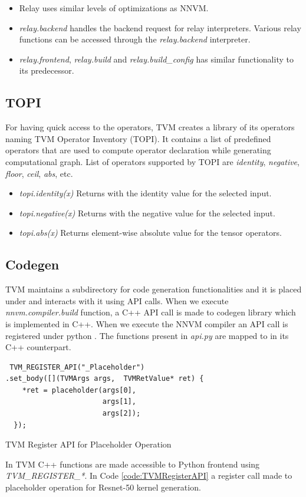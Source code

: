 \begin{itemize}
    \item Relay uses similar levels of optimizations as NNVM.
    \item \textit{relay.backend}  handles the backend request for relay interpreters. Various relay functions can be accessed through the \textit{relay.backend} interpreter.
    \item \textit{relay.frontend},  \textit{relay.build}  and \textit{relay.build\_config}  has similar functionality to its predecessor.
\end{itemize}

 \subsection{TOPI}
 For having quick access to the operators, TVM creates a library of its operators naming TVM Operator Inventory (TOPI). It contains a list of predefined operators that are used to compute operator declaration while generating computational graph. List of operators supported by TOPI are \textit{identity}, \textit{negative}, \textit{floor}, \textit{ceil}, \textit{abs}, etc.
 \begin{itemize}
\item \textit{topi.identity(x)} Returns with the identity value for the selected input.
\item \textit{topi.negative(x)} Returns with the negative value for the selected input.
\item \textit{topi.abs(x)}  Returns element-wise absolute value for the tensor operators.
 \end{itemize}
 
 \subsection{Codegen}
TVM maintains a subdirectory for code generation functionalities and it is placed under  and interacts with it using API calls. When we execute \textit{nnvm.compiler.build} function, a C++ API call is made to codegen library which is implemented in C++. When we execute the NNVM compiler an API call is registered under python . The functions present in \textit{api.py} are mapped to    in its C++ counterpart.
 
  \begin{code}[!htb]
 \begin{verbatim}
 TVM_REGISTER_API("_Placeholder")
.set_body([](TVMArgs args,  TVMRetValue* ret) {
    *ret = placeholder(args[0],
                       args[1],
                       args[2]);
  });
 \end{verbatim}
\caption{TVM Register API for Placeholder Operation \cite{tvm_code}} 
\label{code:TVMRegisterAPI}
\end{code} 
In TVM C++ functions are made accessible to Python frontend using \textit{TVM\_REGISTER\_*}. In Code \ref{code:TVMRegisterAPI} a register call made to placeholder operation for Resnet-50 kernel generation.
 
